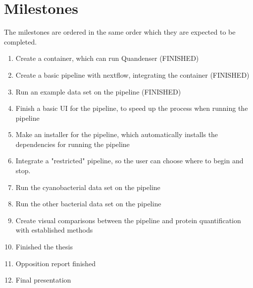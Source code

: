 \section{Milestones}

The milestones are ordered in the same order which they are expected to be completed.

\begin{enumerate}
\item Create a container, which can run Quandenser (FINISHED)
\item Create a basic pipeline with nextflow, integrating the container (FINISHED)
\item Run an example data set on the pipeline (FINISHED)
\item Finish a basic UI for the pipeline, to speed up the process when running the pipeline
\item Make an installer for the pipeline, which automatically installs the dependencies for running the pipeline
\item Integrate a "restricted" pipeline, so the user can choose where to begin and stop.
\item Run the cyanobacterial data set on the pipeline
\item Run the other bacterial data set on the pipeline
\item Create visual comparisons between the pipeline and protein quantification with established methods
\item Finished the thesis
\item Opposition report finished
\item Final presentation
\end{enumerate}
